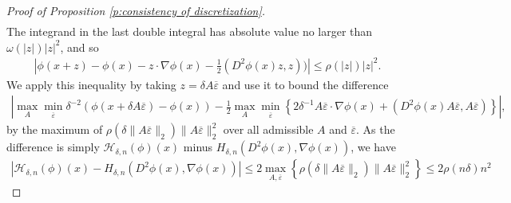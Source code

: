 \documentclass[reqno]{amsart}
\numberwithin{equation}{section}
\begin{document}
\begin{proof}[Proof of Proposition \ref{p:consistency of discretization}]
\begin{align*}
  \end{align*}
  The integrand in the last double integral has absolute value no larger than $\omega(|z|)|z|^2$, and so
  \begin{align*}
    |\phi(x+z) - \phi(x)  -  z\cdot \nabla \phi(x) - \tfrac{1}{2}(D^2\phi(x) z,z)) | \leq \rho(|z|)|z|^2.
  \end{align*}
  We apply this inequality by taking $z = \delta A\overline \varepsilon$ and use it to bound the difference
  \begin{align*}
    \left | \max_A \min_{\overline\varepsilon}\delta^{-2}(\phi(x+\delta A\overline \varepsilon)-\phi(x)) - \tfrac{1}{2}\max_A \min_{\overline\varepsilon}\left \{ 2\delta^{-1} A\overline \varepsilon \cdot \nabla \phi(x) + (D^2\phi(x)A\overline \varepsilon,A\overline \varepsilon)\right \} \right |,
  \end{align*}
  by the maximum of $\rho(\delta \|A\overline \varepsilon\|_2)\|A\overline\varepsilon\|_2^2$ over all admissible $A$ and $\overline\varepsilon$. As the difference is simply $\mathcal{H}_{\delta,n}(\phi)(x)$ minus $H_{\delta,n}(D^2\phi(x),\nabla \phi(x))$, we have 
  \begin{align*}
    \left | \mathcal{H}_{\delta,n}(\phi)(x) - H_{\delta,n}(D^2\phi(x),\nabla \phi(x))  \right | \leq 2\max_{A,\overline\varepsilon}\left \{ \rho(\delta \|A\overline\varepsilon\|_2)\|A\overline\varepsilon\|_2^2 \right \} \leq 2\rho(n\delta )n^2
  \end{align*}  



\end{proof}
\end{document}
